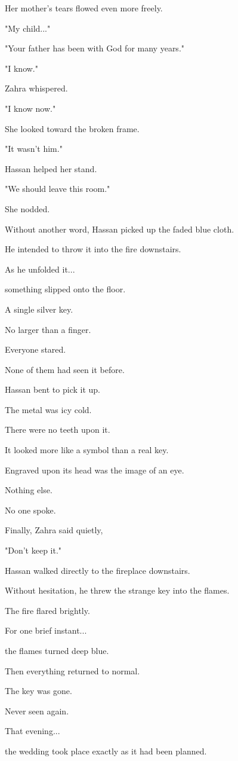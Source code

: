 \documentclass[12pt,openany]{book}
\begin{document}
Her mother's tears flowed even more freely.

"My child..."

"Your father has been with God for many years."

"I know."

Zahra whispered.

"I know now."

She looked toward the broken frame.

"It wasn't him."

Hassan helped her stand.

"We should leave this room."

She nodded.

Without another word, Hassan picked up the faded blue cloth.

He intended to throw it into the fire downstairs.

As he unfolded it...

something slipped onto the floor.

A single silver key.

No larger than a finger.

Everyone stared.

None of them had seen it before.

Hassan bent to pick it up.

The metal was icy cold.

There were no teeth upon it.

It looked more like a symbol than a real key.

Engraved upon its head was the image of an eye.

Nothing else.

No one spoke.

Finally, Zahra said quietly,

"Don't keep it."

Hassan walked directly to the fireplace downstairs.

Without hesitation, he threw the strange key into the flames.

The fire flared brightly.

For one brief instant...

the flames turned deep blue.

Then everything returned to normal.

The key was gone.

Never seen again.

That evening...

the wedding took place exactly as it had been planned.
\end{document}
